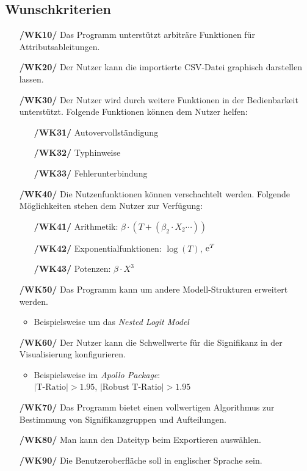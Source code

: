 \documentclass{article}
\begin{document}
\subsection{Wunschkriterien}
\begin{itemize}
    \item[\textbf{/WK10/}] Das Programm unterstützt arbiträre Funktionen für Attributsableitungen.
    \item[\textbf{/WK20/}] Der Nutzer kann die importierte CSV-Datei graphisch darstellen lassen.
    \item[\textbf{/WK30/}] Der Nutzer wird durch weitere Funktionen in der Bedienbarkeit unterstützt. \newline Folgende Funktionen können dem Nutzer helfen:
    \begin{itemize}[leftmargin=.7in]
        \item[\textbf{/WK31/}] Autovervollständigung
        \item[\textbf{/WK32/}] Typhinweise
        \item[\textbf{/WK33/}] Fehlerunterbindung
    \end{itemize}
    \item[\textbf{/WK40/}] Die Nutzenfunktionen können verschachtelt werden.
    \newline Folgende Möglichkeiten stehen dem Nutzer zur Verfügung:
    \begin{itemize}[leftmargin=.7in]
        \item[\textbf{/WK41/}] Arithmetik: $\beta \cdot (T + (\beta_2 \cdot X_2 \cdots))$
        \item[\textbf{/WK42/}] Exponentialfunktionen: $\log(T)$, ${\rm e}^T$
        \item[\textbf{/WK43/}] Potenzen: $\beta \cdot X^3$
    \end{itemize}
    \item[\textbf{/WK50/}] Das Programm kann um andere Modell-Strukturen erweitert werden.
    \begin{itemize}
        \item Beispielsweise um das \emph{Nested Logit Model}
    \end{itemize}
    \item[\textbf{/WK60/}] Der Nutzer kann die Schwellwerte für die Signifikanz in der Visualisierung konfigurieren.
    \begin{itemize}
        \item Beispielsweise im \emph{Apollo Package}:\\
        $|\text{T-Ratio}| > 1.95$, $|\text{Robust T-Ratio}| > 1.95$
    \end{itemize}    
    \item[\textbf{/WK70/}] Das Programm bietet einen vollwertigen Algorithmus zur Bestimmung von Signifikanzgruppen und Aufteilungen.
    \item[\textbf{/WK80/}] Man kann den Dateityp beim Exportieren auswählen. 
    \item[\textbf{/WK90/}] Die Benutzeroberfläche soll in englischer Sprache sein.
\end{itemize}
\end{document}
